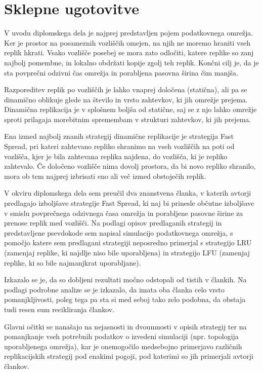 \documentclass[a4paper, 12pt]{book}
\begin{document}
\chapter{Sklepne ugotovitve}

V uvodu diplomskega dela je najprej predstavljen pojem podatkovnega omre\-žja.
Ker je prostor na posameznih vozliščih omejen, na njih ne moremo hraniti
vseh replik hkrati. Vsako vozlišče posebej se mora zato odločiti, katere
replike so zanj najbolj pomembne, in lokalno obdržati kopije zgolj teh replik.
Končni cilj je, da je sta povprečni odzivni čas omrežja in porabljena pasovna
širina čim manjša.

Razporeditev replik po vozliščih je lahko vnaprej določena (statična), ali
pa se dinamično oblikuje glede na število in vrsto zahtevkov, ki jih omrežje
prejema. Dinamična replikacija je v splošnem boljša od statične, saj se
z njo lahko omrežje sproti prilagaja morebitnim spremembam v strukturi
zahtevkov, ki jih prejema.

Ena izmed najbolj znanih strategij dinamične replikacije je strategija
Fast Spread, pri kateri zahtevano repliko shranimo na vseh vozliščih na
poti od vozlišča, kjer je bila zahtevana replika najdena, do vozlišča, ki
je repliko zahtevalo. Če določeno vozlišče nima dovolj prostora, da
bi novo repliko shranilo, mora ob tem najprej izbrisati eno ali več
izmed obstoječih replik.

V okviru diplomskega dela sem preučil dva znanstvena članka, v katerih avtorji
predlagajo izboljšave strategije Fast Spread, ki naj bi prinesle občutne
izboljšave v smislu povprečnega odzivnega časa omrežja in porabljene
pasovne širine za prenose replik med vozlišči. Na podlagi opisov predlaganih
strategij in predstavljene psevdokode sem napisal simulacijo podatkovnega
omrežja, s pomočjo katere sem predlagani strategiji neposredno primerjal s
strategijo LRU (zamenjaj replike, ki najdlje niso bile uporabljena) in
strategijo LFU (zamenjaj replike, ki so bile najmanjkrat uporabljane).

Izkazalo se je, da so dobljeni rezultati močno odstopali od tistih v člankih.
Na podlagi podrobne analize se je izkazalo, da imata oba članka celo vrsto
pomanjkljivosti, poleg tega pa sta si med seboj tako zelo podobna, da
obstaja tudi resen sum recikliranja člankov.

Glavni očitki se nanašajo na nejasnosti in dvoumnosti v opisih strategij
ter na pomanjkanje vseh potrebnih podatkov o izvedeni simulaciji (npr.
topologija uporabljenega omrežja), kar je onemogočilo medsebojno primerjavo
različnih replikacijskih strategij pod enakimi pogoji, pod katerimi so jih
primerjali avtorji člankov.
\end{document}
